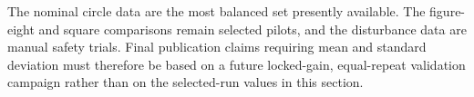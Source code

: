 The nominal circle data are the most balanced set presently available. The
figure-eight and square comparisons remain selected pilots, and the
disturbance data are manual safety trials. Final publication claims requiring
mean and standard deviation must therefore be based on a future locked-gain,
equal-repeat validation campaign rather than on the selected-run values in
this section.

\FloatBarrier
